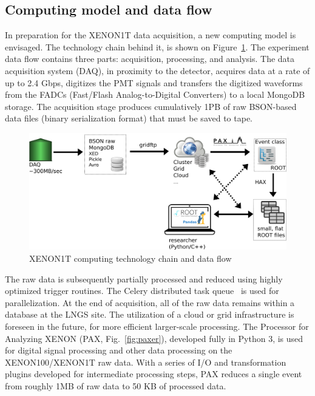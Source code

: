 \documentclass[a4paper]{jpconf}
\begin{document}
\subsection{Computing model and data flow}
In preparation for the XENON1T data acquisition, a new computing model is envisaged. 
The technology chain behind it, is shown on Figure~\ref{fig:XENON1T_flow}.
The experiment data flow contains three parts: acquisition, processing, and analysis. 
The data acquisition system (DAQ), in proximity to the detector, acquires data at a rate of up to 2.4 Gbps, digitizes the PMT signals
and transfers the digitized waveforms from the FADCs (Fast/Flash Analog-to-Digital Converters)
to a local MongoDB storage. The acquisition stage produces cumulatively 1PB of raw BSON-based data
files (binary serialization format) that must be saved to tape.
\begin{figure}[!b]
 \centering
\begin{center}
\includegraphics[width=0.8\linewidth]{./graphics/XENON1T_flow1.png}
\caption{XENON1T computing technology chain and data flow}
\label{fig:XENON1T_flow}
\end{center}
\end{figure}
The raw data is subsequently partially processed and reduced using highly optimized trigger routines.
The Celery distributed task queue~\cite{solem2014celery} is used for parallelization. 
At the end of
acquisition, all of the raw data remains within a database at the LNGS site. The utilization of a cloud or grid infrastructure is foreseen in the future, for more efficient larger-scale processing.
The Processor for Analyzing XENON (PAX, Fig.~\ref{fig:paxer}), developed fully in Python 3, is used for digital signal processing and other data processing on the XENON100/XENON1T raw data.
With a series of I/O and transformation plugins developed for intermediate processing steps, PAX reduces a single event from roughly 1MB
of raw data to 50 KB of processed data. 
\end{document}
